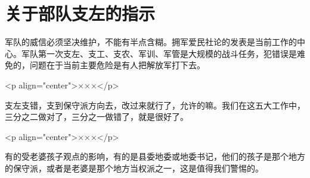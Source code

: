 \section[关于部队支左的指示（一九六七年四月）]{关于部队支左的指示}


军队的威信必须坚决维护，不能有半点含糊。拥军爱民社论的发表是当前工作的中心。军队第一次支左、支工、支农、军训、军管是大规模的战斗任务，犯错误是难免的，问题在于当前主要危险是有人把解放军打下去。

<p align="center">×××</p>

支左支错，支到保守派方向去，改过来就行了，允许的嘛。我们在这五大工作中，三分之二做对了，三分之一做错了，就是很好了。

<p align="center">×××</p>

有的受老婆孩子观点的影响，有的是县委地委或地委书记，他们的孩子是那个地方的保守派，或者是老婆是那个地方当权派之一，这是值得我们警惕的。



